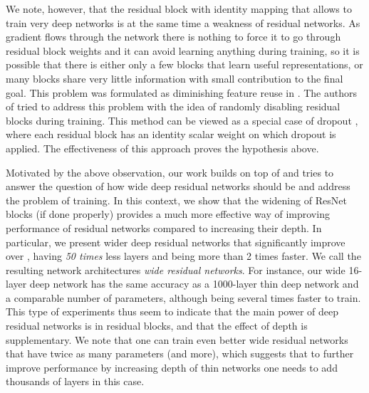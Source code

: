 \documentclass{bmvc2k}
\begin{document}
 We note, however, that the residual block with identity mapping that allows to train very deep networks is at the same time a weakness of residual networks. As gradient flows through the network there is nothing to force it to go through residual block weights and it can avoid learning anything during training, so it is possible that there is either only a few blocks that learn useful representations, or many blocks share very little information with small contribution to the final goal. This problem was formulated as diminishing feature reuse in \cite{highway}.
The authors of \cite{stochastic_depth} tried to address this problem with the idea of randomly disabling residual blocks during training. This method can be viewed as a special case of dropout \cite{srivastava14a}, where each residual block has an identity scalar weight on which dropout is applied. The effectiveness of this approach proves the hypothesis above.

Motivated by the above observation, our work builds on top of \cite{basicblock2} and tries to answer the question of how wide deep residual networks should be and address the problem of training. In this context, we  show  that the  widening of  ResNet blocks (if done properly) provides a much more effective way of improving performance of residual networks compared to increasing their depth.
 In particular, we   present wider deep residual networks that significantly improve over \cite{basicblock2},  having \textit{50 times} less layers and being more than 2 times faster.
 We call the resulting network architectures \emph{wide residual networks}. For instance, our wide 16-layer deep network has the same accuracy as a 1000-layer thin deep network and a comparable number of parameters, although being several times faster to train. This type of experiments thus seem to indicate that the main power of deep residual networks is in residual blocks, and that the effect of depth is supplementary.
 We  note that one can train even better wide residual networks  that have twice as many parameters (and more), which suggests that to further improve performance by increasing depth of thin networks   one needs to add thousands of layers in this case.
\end{document}
